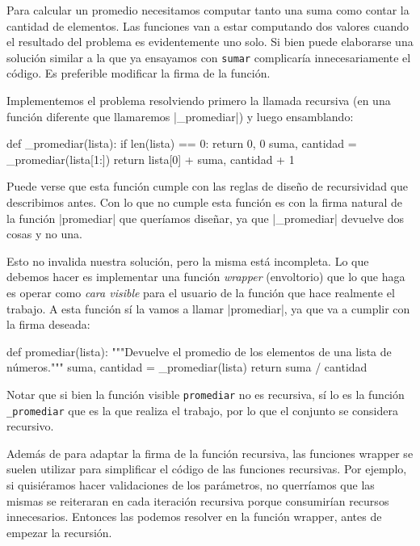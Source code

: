 Para calcular un promedio necesitamos computar tanto una suma como contar
la cantidad de elementos. Las funciones van a estar computando dos valores
cuando el resultado del problema es evidentemente uno solo. Si bien puede
elaborarse una solución similar a la que ya ensayamos con \lstinline!sumar!
complicaría innecesariamente el código. Es preferible modificar la firma
de la función.

Implementemos el problema resolviendo primero la llamada recursiva (en una
función diferente que llamaremos |_promediar|) y luego ensamblando:
\begin{codigo-python-sn}
def _promediar(lista):
    if len(lista) == 0:
        return 0, 0
    suma, cantidad = _promediar(lista[1:])
    return lista[0] + suma, cantidad + 1
\end{codigo-python-sn}
Puede verse que esta función cumple con las reglas de diseño de recursividad
que describimos antes. Con lo que no cumple esta función es con la firma
natural de la función |promediar| que queríamos diseñar, ya que |_promediar|
devuelve dos cosas y no una.

Esto no invalida nuestra solución, pero la misma está incompleta. Lo que
debemos hacer es implementar una función \emph{wrapper} (envoltorio) que lo
que haga es operar como \emph{cara visible} para el usuario de la función que
hace realmente el trabajo. A esta función sí la vamos a llamar |promediar|, ya
que va a cumplir con la firma deseada:

\begin{codigo-python-sn}
def promediar(lista):
   """Devuelve el promedio de los elementos de una lista de números."""
   suma, cantidad = _promediar(lista)
   return suma / cantidad
\end{codigo-python-sn}

Notar que si bien la función visible \lstinline!promediar! no es recursiva, sí lo
es la función \lstinline!_promediar! que es la que realiza el trabajo, por
lo que el conjunto se considera recursivo.

Además de para adaptar la firma de la función recursiva, las funciones wrapper
se suelen utilizar para simplificar el código de las funciones recursivas. Por
ejemplo, si quisiéramos hacer validaciones de los parámetros, no
querríamos que las mismas se reiteraran en cada iteración recursiva porque
consumirían recursos innecesarios. Entonces las podemos resolver en la función
wrapper, antes de empezar la recursión.


